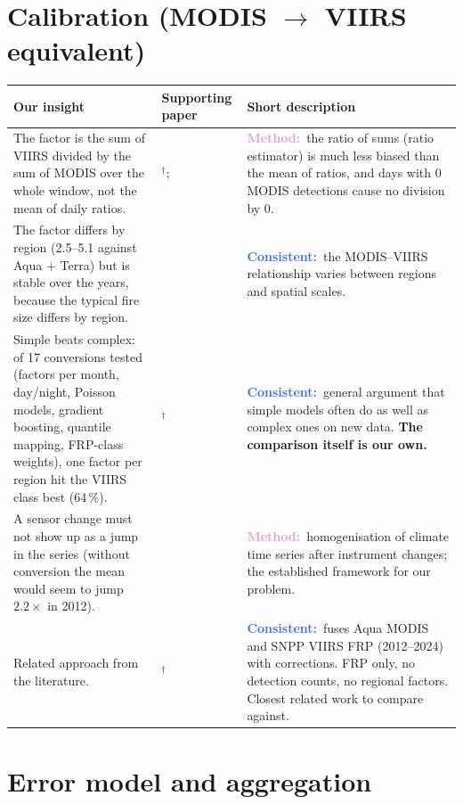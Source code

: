 \documentclass[10pt,a4paper]{article}
\newcommand{\fitlabel}[2]{\textcolor{#1}{\textbf{#2}}}
\newcommand{\consistent}{\fitlabel{RoyalBlue}{Consistent:}}
\newcommand{\method}{\fitlabel{Plum}{Method:}}
\newcommand{\abs}{$^\dagger$}   %
\newenvironment{insighttable}{%
  \small
  \begin{longtable}{L{0.36\textwidth} L{0.17\textwidth} L{0.41\textwidth}}
  \toprule
  \textbf{Our insight} & \textbf{Supporting paper} & \textbf{Short description} \\
  \midrule
  \endhead
  \bottomrule
  \endfoot
}{%
  \end{longtable}
}
\begin{document}
\section{\texorpdfstring{Calibration (MODIS $\rightarrow$ VIIRS equivalent)}{Calibration (MODIS to VIIRS equivalent)}}

\begin{insighttable}
The factor is the sum of VIIRS divided by the sum of MODIS over the whole window, not the mean of daily ratios.
& \citet{cochran1977}\abs; \citet{gregoire2009}
& \method\ the ratio of sums (ratio estimator) is much less biased than the mean of ratios, and days with
0 MODIS detections cause no division by 0. \\

The factor differs by region (2.5--5.1 against Aqua + Terra) but is stable over the years, because the
typical fire size differs by region.
& \citet{li2018}
& \consistent\ the MODIS--VIIRS relationship varies between regions and spatial scales. \\

Simple beats complex: of 17 conversions tested (factors per month, day/night, Poisson models, gradient boosting,
quantile mapping, FRP-class weights), one factor per region hit the VIIRS class best (64\,\%).
& \citet{hand2006}\abs
& \consistent\ general argument that simple models often do as well as complex ones on new data.
\textbf{The comparison itself is our own.} \\

A sensor change must not show up as a jump in the series (without conversion the mean would seem to jump
$2.2\times$ in 2012).
& \citet{venema2012}
& \method\ homogenisation of climate time series after instrument changes; the established framework for
our problem. \\

Related approach from the literature.
& \citet{zheng2026}\abs
& \consistent\ fuses Aqua MODIS and SNPP VIIRS FRP (2012--2024) with corrections. FRP only, no detection
counts, no regional factors. Closest related work to compare against. \\
\end{insighttable}

\section{Error model and aggregation}
\end{document}
